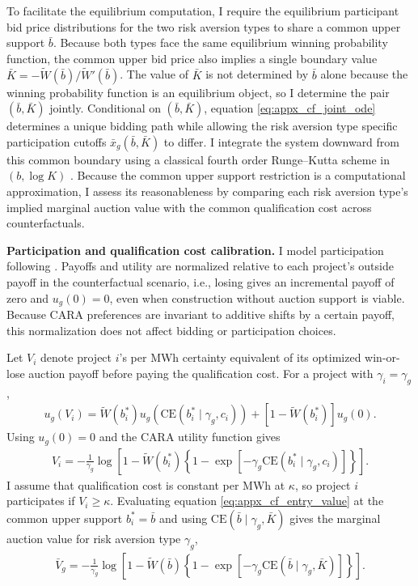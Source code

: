 \documentclass[12pt]{article}
\theoremstyle{definition} %
\begin{document}
To facilitate the equilibrium computation, I require the equilibrium participant bid price distributions for the two risk aversion types to share a common upper support $\bar b$. Because both types face the same equilibrium winning probability function, the common upper bid price also implies a single boundary value $\bar K=-\widetilde W(\bar b)/\widetilde W'(\bar b)$. The value of $\bar K$ is not determined by $\bar b$ alone because the winning probability function is an equilibrium object, so I determine the pair $(\bar b,\bar K)$ jointly. Conditional on $(\bar b,\bar K)$, equation \eqref{eq:appx_cf_joint_ode} determines a unique bidding path while allowing the risk aversion type specific participation cutoffs $\bar{x}_g(\bar b,\bar K)$ to differ. I integrate the system downward from this common boundary using a classical fourth order Runge--Kutta scheme in $(b,\log K)$ \citep*{Hairer1993}. Because the common upper support restriction is a computational approximation, I assess its reasonableness by comparing each risk aversion type's implied marginal auction value with the common qualification cost across counterfactuals.

\textbf{Participation and qualification cost calibration.} I model participation following \citet{Bolotnyy2023}. Payoffs and utility are normalized relative to each project's outside payoff in the counterfactual scenario, i.e., losing gives an incremental payoff of zero and $u_g(0)=0$, even when construction without auction support is viable. Because CARA preferences are invariant to additive shifts by a certain payoff, this normalization does not affect bidding or participation choices.

Let $V_i$ denote project $i$'s per MWh certainty equivalent of its optimized win-or-lose auction payoff before paying the qualification cost. For a project with $\gamma_i=\gamma_g$,
\begin{align*}
u_g(V_i)
=\widetilde W(b_i^\ast)u_g\left(\mathrm{CE}(b_i^\ast\mid\gamma_g,c_i)\right)
+\left[1-\widetilde W(b_i^\ast)\right]u_g(0).
\end{align*}
Using $u_g(0)=0$ and the CARA utility function gives
\begin{align}
V_i
=-\frac{1}{\gamma_g}
\log\left[1-\widetilde W(b_i^\ast)
\left\{1-\exp\left[-\gamma_g\mathrm{CE}(b_i^\ast\mid\gamma_g,c_i)\right]\right\}\right].
\label{eq:appx_cf_entry_value}
\end{align}
I assume that qualification cost is constant per MWh at $\kappa$, so project $i$ participates if $V_i\geq\kappa$. Evaluating equation \eqref{eq:appx_cf_entry_value} at the common upper support $b_i^\ast=\bar b$ and using $\mathrm{CE}(\bar b\mid\gamma_g,\bar K)$ gives the marginal auction value for risk aversion type $\gamma_g$,
\begin{align*}
\bar V_g
=-\frac{1}{\gamma_g}
\log\left[1-\widetilde W(\bar b)
\left\{1-\exp\left[-\gamma_g\mathrm{CE}(\bar b\mid\gamma_g,\bar K)\right]\right\}\right].
\end{align*}
\end{document}

